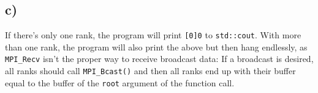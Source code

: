 \documentclass[11pt,a4paper]{article}
\begin{document}
\subsection{c)}
If there's only one rank, the program will print \texttt{[0]0} to \texttt{std::cout}.
With more than one rank, the program will also print the above but then hang endlessly, as
\texttt{MPI\_Recv} isn't the proper way to receive broadcast data: If a broadcast is
desired, all ranks should call \texttt{MPI\_Bcast()} and then all ranks end up
with their buffer equal to the buffer of the \texttt{root} argument of the function call.


\end{document}
